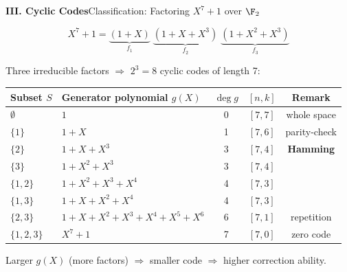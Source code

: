 \begin{frame}{\textbf{III. Cyclic Codes}}{Classification: Factoring $X^7+1$ over $\F_2$}

\[X^7+1 = \underbrace{(1+X)}_{f_1}\;\underbrace{(1+X+X^3)}_{f_2}\;\underbrace{(1+X^2+X^3)}_{f_3}\]

Three irreducible factors $\Rightarrow$ $2^3 = 8$ cyclic codes of length 7:

\medskip
\renewcommand{\arraystretch}{1.25}
\begin{center}
\begin{tabular}{@{}p{1.4cm}p{5.3cm}ccc@{}}
  \toprule
  Subset $S$ & Generator polynomial $g(X)$ & $\deg g$ & $[n,k]$ & Remark\\
  \midrule
  $\emptyset$     & $1$                               & 0 & $[7,7]$ & whole space\\
  $\{1\}$         & $1+X$                             & 1 & $[7,6]$ & parity-check\\
  $\{2\}$         & $1+X+X^3$                         & 3 & $[7,4]$ & \textcolor{TealDarkCyan}{\textbf{Hamming}}\\
  $\{3\}$         & $1+X^2+X^3$                       & 3 & $[7,4]$ & \\
  $\{1,2\}$       & $1+X^2+X^3+X^4$                   & 4 & $[7,3]$ & \\
  $\{1,3\}$       & $1+X+X^2+X^4$                     & 4 & $[7,3]$ & \\
  $\{2,3\}$       & $1+X+X^2+X^3+X^4+X^5+X^6$        & 6 & $[7,1]$ & repetition\\
  $\{1,2,3\}$     & $X^7+1$                           & 7 & $[7,0]$ & zero code\\
  \bottomrule
\end{tabular}
\end{center}

\vspace{2pt}
{\small Larger $g(X)$ (more factors) $\Rightarrow$ smaller code $\Rightarrow$ higher correction ability.}
\end{frame}


